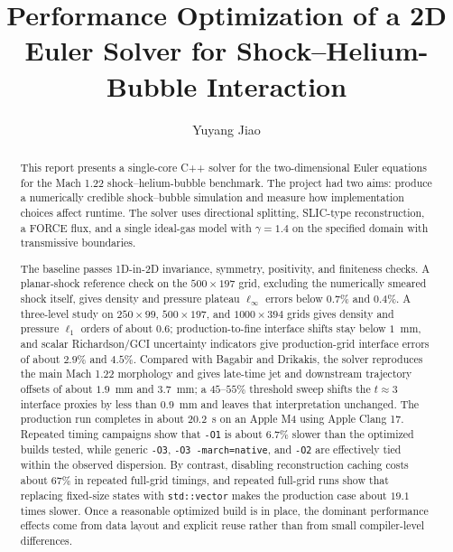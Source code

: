 \documentclass[final,3p,times,twocolumn]{elsarticle}
\begin{document}
\begin{frontmatter}

\title{Performance Optimization of a 2D Euler Solver for Shock--Helium-Bubble Interaction}

\author{Yuyang Jiao}

\begin{abstract}
This report presents a single-core C++ solver for the two-dimensional Euler equations for the Mach 1.22 shock--helium-bubble benchmark. The project had two aims: produce a numerically credible shock--bubble simulation and measure how implementation choices affect runtime. The solver uses directional splitting, SLIC-type reconstruction, a FORCE flux, and a single ideal-gas model with $\gamma = 1.4$ on the specified domain with transmissive boundaries.

The baseline passes 1D-in-2D invariance, symmetry, positivity, and finiteness checks. A planar-shock reference check on the $500 \times 197$ grid, excluding the numerically smeared shock itself, gives density and pressure plateau $\ell_\infty$ errors below $0.7\%$ and $0.4\%$. A three-level study on $250 \times 99$, $500 \times 197$, and $1000 \times 394$ grids gives density and pressure $\ell_1$ orders of about $0.6$; production-to-fine interface shifts stay below $1$~mm, and scalar Richardson/GCI uncertainty indicators give production-grid interface errors of about $2.9\%$ and $4.5\%$. Compared with Bagabir and Drikakis, the solver reproduces the main Mach 1.22 morphology and gives late-time jet and downstream trajectory offsets of about $1.9$~mm and $3.7$~mm; a $45$--$55\%$ threshold sweep shifts the $t \approx 3$ interface proxies by less than $0.9$~mm and leaves that interpretation unchanged. The production run completes in about $20.2$~s on an Apple M4 using Apple Clang 17. Repeated timing campaigns show that \texttt{-O1} is about $6.7\%$ slower than the optimized builds tested, while generic \texttt{-O3}, \texttt{-O3 -march=native}, and \texttt{-O2} are effectively tied within the observed dispersion. By contrast, disabling reconstruction caching costs about $67\%$ in repeated full-grid timings, and repeated full-grid runs show that replacing fixed-size states with \texttt{std::vector} makes the production case about $19.1$ times slower. Once a reasonable optimized build is in place, the dominant performance effects come from data layout and explicit reuse rather than from small compiler-level differences.
\end{abstract}

\end{frontmatter}
\end{document}
